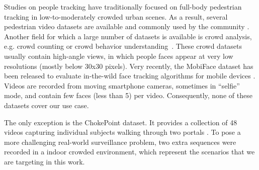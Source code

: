 Studies on people tracking have traditionally focused on full-body pedestrian tracking in low-to-moderately crowded urban scenes. As a result, several pedestrian video datasets are available and commonly used by the community \cite{li2014datasetCUHK, liu2018datasetShanghaiTech, deng2014datasetPETA}. Another field for which a large number of datasets is available is crowd analysis, e.g. crowd counting or crowd behavior understanding~\cite{rodriguez2011datasetDriven, zhang2015datasetWorldExpo, dendorfer2019cvpr19}. These crowd datasets usually contain high-angle views, in which people faces appear at very low resolutions (mostly below 30x30 pixels). Very recently, the MobiFace dataset has been released to evaluate in-the-wild face tracking algorithms for mobile devices \cite{lin2019mobiface}. Videos are recorded from moving smartphone cameras, sometimes in ``selfie'' mode, and contain few faces (less than 5) per video. Consequently, none of these datasets cover our use case.

The only exception is the ChokePoint dataset. It provides a collection of 48 videos capturing individual subjects walking through two portals \cite{wong2011chokepoint}. To pose a more challenging real-world surveillance problem, two extra sequences were recorded in a indoor crowded environment, which represent the scenarios that we are targeting in this work. 